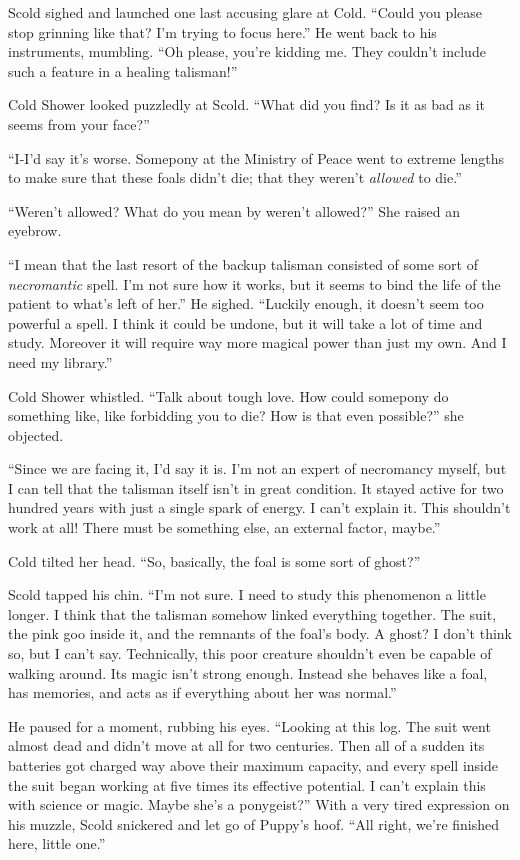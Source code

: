 Scold sighed and launched one last accusing glare at Cold. ``Could you please stop grinning like that? I'm trying to focus here.'' He went back to his instruments, mumbling. ``Oh please, you're kidding me. They couldn't include such a feature in a healing talisman!''

Cold Shower looked puzzledly at Scold. ``What did you find? Is it as bad as it seems from your face?''

``I-I'd say it's worse. Somepony at the Ministry of Peace went to extreme lengths to make sure that these foals didn't die; that they weren't \emph{allowed} to die.''

``Weren't allowed? What do you mean by weren't allowed?'' She raised an eyebrow.

``I mean that the last resort of the backup talisman consisted of some sort of \emph{necromantic} spell. I'm not sure how it works, but it seems to bind the life of the patient to what's left of her.'' He sighed. ``Luckily enough, it doesn't seem too powerful a spell. I think it could be undone, but it will take a lot of time and study. Moreover it will require way more magical power than just my own. And I need my library.''

Cold Shower whistled. ``Talk about tough love. How could somepony do something like, like forbidding you to die? How is that even possible?'' she objected.

``Since we are facing it, I'd say it is. I'm not an expert of necromancy myself, but I can tell that the talisman itself isn't in great condition. It stayed active for two hundred years with just a single spark of energy. I can't explain it. This shouldn't work at all! There must be something else, an external factor, maybe.''

Cold tilted her head. ``So, basically, the foal is some sort of ghost?''

Scold tapped his chin. ``I'm not sure. I need to study this phenomenon a little longer. I think that the talisman somehow linked everything together. The suit, the pink goo inside it, and the remnants of the foal's body. A ghost? I don't think so, but I can't say. Technically, this poor creature shouldn't even be capable of walking around. Its magic isn't strong enough. Instead she behaves like a foal, has memories, and acts as if everything about her was normal.''

He paused for a moment, rubbing his eyes. ``Looking at this log. The suit went almost dead and didn't move at all for two centuries. Then all of a sudden its batteries got charged way above their maximum capacity, and every spell inside the suit began working at five times its effective potential. I can't explain this with science or magic. Maybe she's a ponygeist?'' With a very tired expression on his muzzle, Scold snickered and let go of Puppy's hoof. ``All right, we're finished here, little one.''

